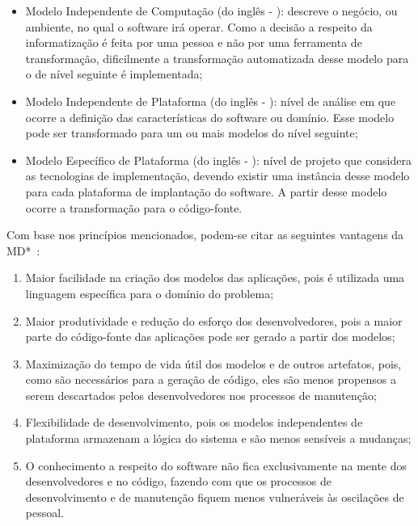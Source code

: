 \begin{itemize}
	\item Modelo Independente de Computação (do inglês - ): descreve o negócio, ou ambiente, no qual o software irá operar. Como a decisão a respeito da informatização é feita por uma pessoa e não por uma ferramenta de transformação, dificilmente a transformação automatizada desse modelo para o de nível seguinte é implementada;
	\item Modelo Independente de Plataforma (do inglês - ): nível de análise em que ocorre a definição das características do software ou domínio. Esse modelo pode ser transformado para um ou mais modelos do nível seguinte;
	\item Modelo Específico de Plataforma (do inglês - ): nível de projeto que considera as tecnologias de implementação, devendo existir uma instância desse modelo para cada plataforma de implantação do software. A partir desse modelo ocorre a transformação para o código-fonte.
\end{itemize}

Com base nos princípios mencionados, podem-se citar as seguintes vantagens da MD*~\cite{Hutchinson_2011, France_2007, Schmidt_2006}:

\begin{enumerate}
	\item Maior facilidade na criação dos modelos das aplicações, pois é utilizada uma linguagem específica para o domínio do problema;
	\item Maior produtividade e redução do esforço dos desenvolvedores, pois a maior parte do código-fonte das aplicações pode ser gerado a partir dos modelos;
	\item Maximização do tempo de vida útil dos modelos e de outros artefatos, pois, como são necessários para a geração de código, eles são menos propensos a serem descartados pelos desenvolvedores nos processos de manutenção;
	\item Flexibilidade de desenvolvimento, pois os modelos independentes de plataforma armazenam a lógica do sistema e são menos sensíveis a mudanças;
	\item O conhecimento a respeito do software não fica exclusivamente na mente dos desenvolvedores e no código, fazendo com que os processos de desenvolvimento e de manutenção fiquem menos vulneráveis às oscilações de pessoal.
\end{enumerate}

